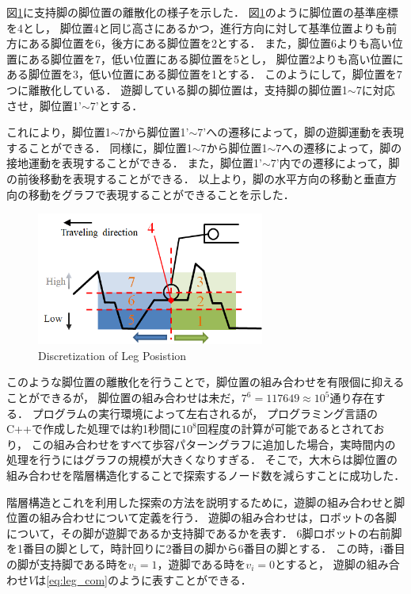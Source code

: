 図\ref*{fig:discretization}に支持脚の脚位置の離散化の様子を示した．
図\ref*{fig:discretization}のように脚位置の基準座標を4とし，
脚位置4と同じ高さにあるかつ，進行方向に対して基準位置よりも前方にある脚位置を6，後方にある脚位置を2とする．
また，脚位置6よりも高い位置にある脚位置を7，低い位置にある脚位置を5とし，
脚位置2よりも高い位置にある脚位置を3，低い位置にある脚位置を1とする．
このようにして，脚位置を7つに離散化している．
遊脚している脚の脚位置は，支持脚の脚位置1$\sim$7に対応させ，脚位置1'$\sim$7'とする．%

これにより，脚位置1$\sim$7から脚位置1'$\sim$7'への遷移によって，脚の遊脚運動を表現することができる．
同様に，脚位置1$\sim$7から脚位置1$\sim$7への遷移によって，脚の接地運動を表現することができる．
また，脚位置1'$\sim$7'内での遷移によって，脚の前後移動を表現することができる．
以上より，脚の水平方向の移動と垂直方向の移動をグラフで表現することができることを示した．

\begin{figure}[htbp]
  \begin{center}
    \includegraphics[width=75mm, clip]{figure/chapter2/discretization_of_leg_pos.png}
    \caption{Discretization of Leg Posistion}
    \label{fig:discretization} %
  \end{center}
\end{figure}

このような脚位置の離散化を行うことで，脚位置の組み合わせを有限個に抑えることができるが，
脚位置の組み合わせは未だ，$7^6 = 117649 \approx 10^5$通り存在する．
プログラムの実行環境によって左右されるが，
プログラミング言語のC++で作成した処理では約1秒間に$10^8$回程度の計算が可能であるとされており\cite{Program_Challenge_Book}，
この組み合わせをすべて歩容パターングラフに追加した場合，実時間内の処理を行うにはグラフの規模が大きくなりすぎる．
そこで，大木らは脚位置の組み合わせを階層構造化することで探索するノード数を減らすことに成功した\cite{Oki_Graph_search}．

階層構造とこれを利用した探索の方法を説明するために，遊脚の組み合わせと脚位置の組み合わせについて定義を行う．
遊脚の組み合わせは，ロボットの各脚について，その脚が遊脚であるか支持脚であるかを表す．
6脚ロボットの右前脚を1番目の脚として，時計回りに2番目の脚から6番目の脚とする．
この時，i番目の脚が支持脚である時を$v_i = 1$，遊脚である時を$v_i = 0$とすると，
遊脚の組み合わせ$V$は\eqref{eq:leg_com}のように表すことができる．

